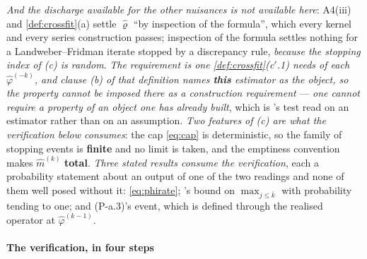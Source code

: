 \emph{And the discharge
available for the other nuisances is not available here}: A4(iii) and \cref{def:crossfit}\textup{(a)} settle
$\hat\varrho$ ``by inspection of the formula'', which every kernel and every series construction passes;
inspection of the formula settles nothing for a Landweber--Fridman iterate stopped by a discrepancy rule,
\emph{because the stopping index of \textup{(c)} is random}.
\emph{The requirement is one \cref{def:crossfit}\textup{(c$'$.1)} needs of each $\hat\varphi^{(-k)}$,
and clause \textup{(b)} of that definition names \textbf{this} estimator as the object, so the property
cannot be imposed there as a construction requirement} --- \emph{one cannot require a property of an
object one has already built}, which is 's test read on an estimator
rather than on an assumption. \emph{Two features of \textup{(c)} are what the verification below
consumes}: the cap \eqref{eq:cap} is deterministic, so the family of stopping events is \textbf{finite}
and no limit is taken, and the emptiness convention makes $\hat m^{(k)}$ \textbf{total}. \emph{Three
stated results consume the verification}, each a probability statement about an output of one of the
two readings and none of them well posed without it: \eqref{eq:phirate}; 's
bound on $\max_{j\le\bar k}$ with probability tending to one; and (P-a.3)'s event, which is defined
through the realised operator at $\hat\varphi^{(k-1)}$.

\paragraph{The verification, in four steps}

